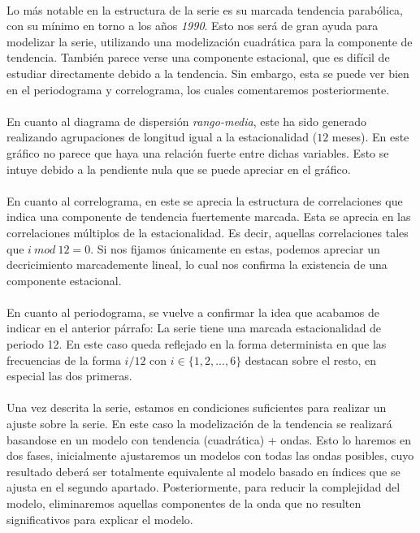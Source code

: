 \documentclass[a4paper, spanish]{article}
\begin{document}
    \paragraph{}
    Lo más notable en la estructura de la serie es su marcada tendencia parabólica, con su mínimo en torno a los años \emph{1990}. Esto nos será de gran ayuda para modelizar la serie, utilizando una modelización cuadrática para la componente de tendencia. También parece verse una componente estacional, que es difícil de estudiar directamente debido a la tendencia. Sin embargo, esta se puede ver bien en el periodograma y correlograma, los cuales comentaremos posteriormente.

    \paragraph{}
    En cuanto al diagrama de dispersión \emph{rango-media}, este ha sido generado realizando agrupaciones de longitud igual a la estacionalidad ($12$ meses). En este gráfico no parece que haya una relación fuerte entre dichas variables. Esto se intuye debido a la pendiente nula que se puede apreciar en el gráfico.

    \paragraph{}
    En cuanto al correlograma, en este se aprecia la estructura de correlaciones que indica una componente de tendencia fuertemente marcada. Esta se aprecia en las correlaciones múltiplos de la estacionalidad. Es decir, aquellas correlaciones tales que $i \ mod \ 12 = 0$. Si nos fijamos únicamente en estas, podemos apreciar un decricimiento marcademente lineal, lo cual nos confirma la existencia de una componente estacional.

    \paragraph{}
    En cuanto al periodograma, se vuelve a confirmar la idea que acabamos de indicar en el anterior párrafo: La serie tiene una marcada estacionalidad de periodo 12. En este caso queda reflejado en la forma determinista en que las frecuencias de la forma $i/12$ con $i \in \{1, 2, ..., 6\}$ destacan sobre el resto, en especial las dos primeras.

    \paragraph{}
    Una vez descrita la serie, estamos en condiciones suficientes para realizar un ajuste sobre la serie. En este caso la modelización de la tendencia se realizará basandose en un modelo con tendencia (cuadrática) + ondas. Esto lo haremos en dos fases, inicialmente ajustaremos un modelos con todas las ondas posibles, cuyo resultado deberá ser totalmente equivalente al modelo basado en índices que se ajusta en el segundo apartado. Posteriormente, para reducir la complejidad del modelo, eliminaremos aquellas componentes de la onda que no resulten significativos para explicar el modelo.
\end{document}
